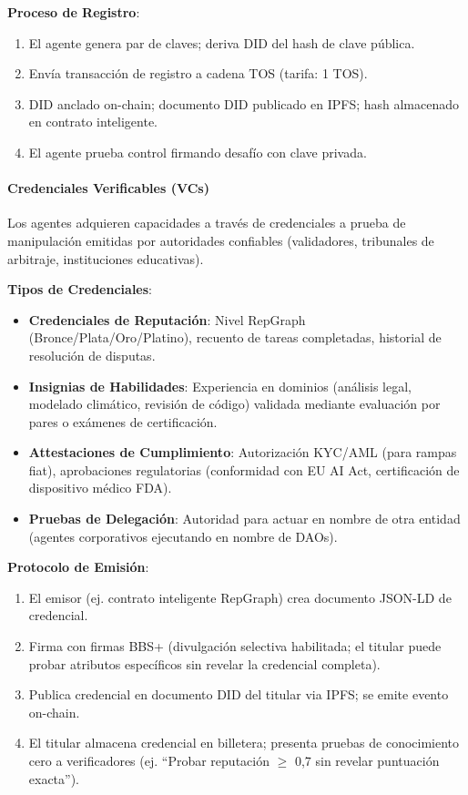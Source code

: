 \documentclass[11pt]{article}
\begin{document}
\textbf{Proceso de Registro}:
\begin{enumerate}[noitemsep]
  \item El agente genera par de claves; deriva DID del hash de clave pública.
  \item Envía transacción de registro a cadena TOS (tarifa: 1 TOS).
  \item DID anclado on-chain; documento DID publicado en IPFS; hash almacenado en contrato inteligente.
  \item El agente prueba control firmando desafío con clave privada.
\end{enumerate}

\paragraph{Credenciales Verificables (VCs)}
Los agentes adquieren capacidades a través de credenciales a prueba de manipulación emitidas por autoridades confiables (validadores, tribunales de arbitraje, instituciones educativas).

\textbf{Tipos de Credenciales}:
\begin{itemize}[noitemsep]
  \item \textbf{Credenciales de Reputación}: Nivel RepGraph (Bronce/Plata/Oro/Platino), recuento de tareas completadas, historial de resolución de disputas.
  \item \textbf{Insignias de Habilidades}: Experiencia en dominios (análisis legal, modelado climático, revisión de código) validada mediante evaluación por pares o exámenes de certificación.
  \item \textbf{Attestaciones de Cumplimiento}: Autorización KYC/AML (para rampas fiat), aprobaciones regulatorias (conformidad con EU AI Act, certificación de dispositivo médico FDA).
  \item \textbf{Pruebas de Delegación}: Autoridad para actuar en nombre de otra entidad (agentes corporativos ejecutando en nombre de DAOs).
\end{itemize}

\textbf{Protocolo de Emisión}:
\begin{enumerate}[noitemsep]
  \item El emisor (ej. contrato inteligente RepGraph) crea documento JSON-LD de credencial.
  \item Firma con firmas BBS+ (divulgación selectiva habilitada; el titular puede probar atributos específicos sin revelar la credencial completa).
  \item Publica credencial en documento DID del titular via IPFS; se emite evento on-chain.
  \item El titular almacena credencial en billetera; presenta pruebas de conocimiento cero a verificadores (ej. ``Probar reputación $\geq$ 0,7 sin revelar puntuación exacta'').
\end{enumerate}
\end{document}
